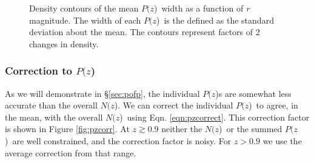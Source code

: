 \documentclass[12pt,preprint]{aastex}
\newcommand{\pofz}{$P(z$)}
\newcommand{\nofz}{$N(z$)}
\begin{document}
\begin{figure}[p]\centering
    \caption{Density contours of the mean \pofz\ width as a function of {\it r} magnitude. 
The width of each \pofz\ is the defined as the standard deviation about the mean. 
The contours represent factors of 2 changes in density.}
    \label{fig:pzwidth}
    \vspace{2em}
\end{figure}

\subsubsection{Correction to \pofz} \label{sec:pzcorr}

As we will demonstrate in \S \ref{sec:pofp}, the individual \pofz s are
somewhat less accurate than the overall \nofz.  We can correct the individual
\pofz\ to agree, in the mean, with the overall \nofz\ using Eqn.
\ref{eqn:pzcorrect}.  This correction factor is shown in Figure
\ref{fig:pzcorr}.  At $z \gtrsim 0.9$ neither the \nofz\ or the summed
\pofz\ are well constrained, and the correction factor is noisy.  For $z > 0.9$
we use the average correction from that range.
\end{document}
